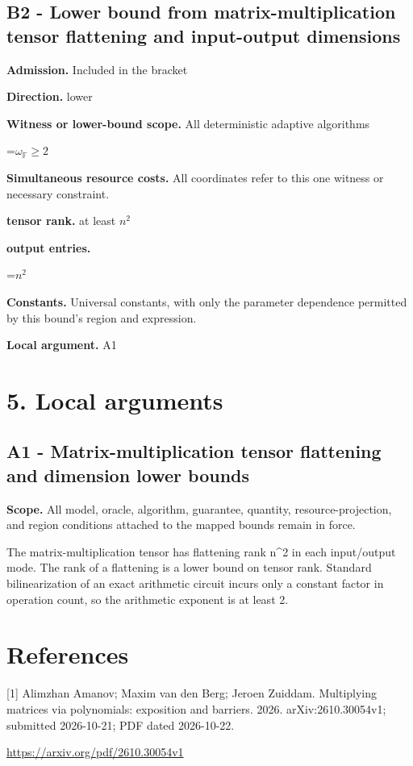 \documentclass[10pt,a4paper]{article}
\newcommand{\AtlasMath}[1]{\par\begingroup\centering\setbox0=\hbox{$\displaystyle #1$}\ifdim\wd0>1.4\linewidth\typeout{ATLAS WIDE FORMULA: \the\wd0}\fi\ifdim\wd0>\linewidth\resizebox{\linewidth}{!}{\box0}\else\box0\fi\par\endgroup}
\begin{document}
\subsection{B2 - Lower bound from matrix-multiplication tensor flattening and input-output dimensions}
\textbf{Admission.} Included in the bracket

\textbf{Direction.} lower

\textbf{Witness or lower-bound scope.} All deterministic adaptive algorithms

\AtlasMath{\omega_{\mathbb{F}}\ge2}
\textbf{Simultaneous resource costs.} All coordinates refer to this one witness or necessary constraint.

\textbf{tensor rank.} at least $n^2$

\textbf{output entries.}

\AtlasMath{n^2}
\textbf{Constants.} Universal constants, with only the parameter dependence permitted by this bound’s region and expression.

\textbf{Local argument.} A1

\section{5. Local arguments}
\subsection{A1 - Matrix-multiplication tensor flattening and dimension lower bounds}
\textbf{Scope.} All model, oracle, algorithm, guarantee, quantity, resource-projection, and region conditions attached to the mapped bounds remain in force.

The matrix-multiplication tensor has flattening rank n\textasciicircum{}2 in each input/output mode. The rank of a flattening is a lower bound on tensor rank. Standard bilinearization of an exact arithmetic circuit incurs only a constant factor in operation count, so the arithmetic exponent is at least 2.

\section{References}
[1] Alimzhan Amanov; Maxim van den Berg; Jeroen Zuiddam. Multiplying matrices via polynomials: exposition and barriers. 2026. arXiv:2610.30054v1; submitted 2026-10-21; PDF dated 2026-10-22.

\url{https://arxiv.org/pdf/2610.30054v1}
\end{document}
